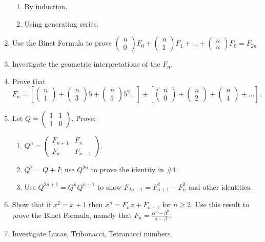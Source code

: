 \documentclass{article}
\begin{document}
\begin{enumerate}
\begin{enumerate}
\item By induction.
\item Using generating series.
\end{enumerate}
\item Use the Binet Formula to prove 
$\left(\begin{matrix}n\\0\end{matrix}\right)F_0+\left(\begin{matrix}n\\1\end{matrix}\right)F_1+{\dots}+\left(\begin{matrix}n\\n\end{matrix}\right)F_0=F_{2n}$
\item Investigate the geometric interpretations of the  $F_n$.
\item Prove that 
$F_n=\left[\left(\begin{matrix}n\\1\end{matrix}\right)+\left(\begin{matrix}n\\3\end{matrix}\right)5+\left(\begin{matrix}n\\5\end{matrix}\right)5^2{\dots}\right]+\left[\left(\begin{matrix}n\\0\end{matrix}\right)+\left(\begin{matrix}n\\2\end{matrix}\right)+\left(\begin{matrix}n\\4\end{matrix}\right)+{\dots}\right].$
\item Let  $Q=\left(\begin{matrix}1&1\\1&0\end{matrix}\right)$. Prove: 

\begin{enumerate}
\item  $Q^n=\left(\begin{matrix}F_{n+1}&F_n\\F_n&F_{n-1}\end{matrix}\right)$.
\item  $Q^2=Q+I$; use  $Q^{2n}$ to prove the identity in \#4. 
\item Use  $Q^{2n+1}=Q^nQ^{n+1}$ to show  $F_{2n+1}=F_{n+1}^2-F_n^2$ and other identities. 
\end{enumerate}
\item Show that if  $x^2=x+1$ then  $x^n=F_nx+F_{n-1}$ for $n{\geq}2$. Use this result to prove the Binet Formula,
namely that  $F_n=\frac{\alpha ^n-\beta ^n}{\alpha -\beta }$.
\item Investigate Lucas, Tribonacci, Tetranacci numbers. 
\end{enumerate}
\end{document}
